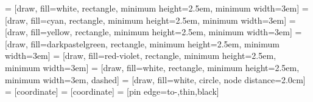  = [draw, fill=white, rectangle, minimum height=2.5em, minimum width=3em]
 = [draw, fill=cyan, rectangle, minimum height=2.5em, minimum width=3em]
 = [draw, fill=yellow, rectangle, minimum height=2.5em, minimum width=3em]
 = [draw, fill=darkpastelgreen, rectangle, minimum height=2.5em, minimum width=3em]
 = [draw, fill=red-violet, rectangle, minimum height=2.5em, minimum width=3em]
 = [draw, fill=white, rectangle, minimum height=2.5em, minimum width=3em, dashed]
 = [draw, fill=white, circle, node distance=2.0cm]
 = [coordinate]
 = [coordinate]
 = [pin edge={to-,thin,black}]

\usetikzlibrary{positioning}
\makeatletter
{}
\makeatother

